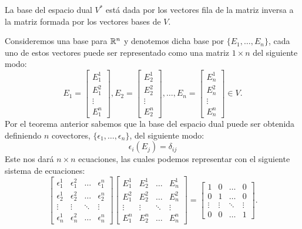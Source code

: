 \begin{example}
	La base del espacio dual $V^{*}$ está dada por los vectores fila de la matriz inversa a la matriz formada por los vectores bases de $V$.

	Consideremos una base para $\mathbb{R}^n$ y denotemos dicha base por $\{E_1,\dots,E_n\}$, cada uno de estos vectores puede ser representado como una matriz $1 \times n$ del siguiente modo:
	\[
		E_1 = \begin{bmatrix}
			E_1^1  \\[12pt]
			E_1^2  \\[12pt]
			\vdots \\[12pt]
			E_1^n
		\end{bmatrix}, E_2 = \begin{bmatrix}
			E_2^1  \\[12pt]
			E_2^2  \\[12pt]
			\vdots \\[12pt]
			E_2^n
		\end{bmatrix}, \hdots, E_n = \begin{bmatrix}
			E_n^1  \\[12pt]
			E_n^2  \\[12pt]
			\vdots \\[12pt]
			E_n^n
		\end{bmatrix} \in V.
	\]
	Por el teorema anterior sabemos que la base del espacio dual puede ser obtenida definiendo $n$ covectores, $\{\epsilon_1,\dots,\epsilon_n\}$, del siguiente modo:
	\[
		\epsilon_i (E_j) = \delta_{ij}
	\]
	Este nos dará $n \times n$ ecuaciones, las cuales podemos representar con el siguiente sistema de ecuaciones:
	\[
		\begin{bmatrix}
			\epsilon_{1}^{1} & \epsilon_{1}^{2} & \hdots & \epsilon_{1}^{n} \\[12pt]
			\epsilon_{2}^{1} & \epsilon_{2}^{2} & \hdots & \epsilon_{2}^{n} \\[12pt]
			\vdots           & \vdots           & \ddots & \vdots           \\[12pt]
			\epsilon_{n}^{1} & \epsilon_{n}^{2} & \hdots & \epsilon_{n}^{n}
		\end{bmatrix}
		\begin{bmatrix}
			E_{1}^{1} & E_{2}^{1} & \hdots & E_{n}^{1} \\[12pt]
			E_{1}^{2} & E_{2}^{2} & \hdots & E_{n}^{2} \\[12pt]
			\vdots    & \vdots    & \ddots & \vdots    \\[12pt]
			E_{1}^{n} & E_{2}^{n} & \hdots & E_{n}^{n}
		\end{bmatrix} = \begin{bmatrix}
			1      & 0      & \hdots & 0      \\
			0      & 1      & \hdots & 0      \\
			\vdots & \vdots & \ddots & \vdots \\
			0      & 0      & \hdots & 1
		\end{bmatrix}.
	\]


\end{example}

